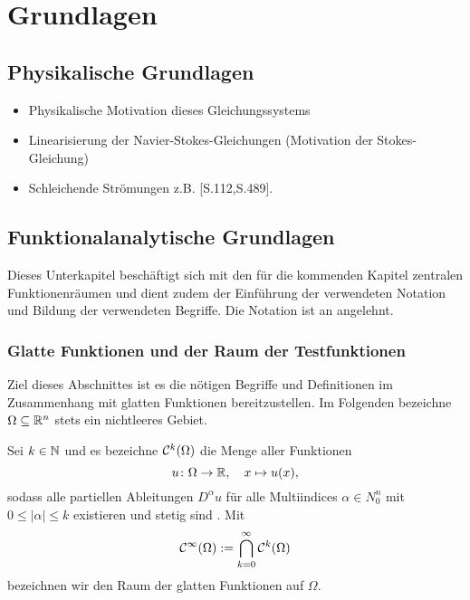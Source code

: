 \chapter{Grundlagen}
\label{cp:grundlagen}

\section{Physikalische Grundlagen}

\begin{itemize}
  \item Physikalische Motivation dieses Gleichungssystems
  \item Linearisierung der Navier-Stokes-Gleichungen (Motivation der Stokes-Gleichung)
  \item Schleichende Strömungen z.B. \cite{spurk10stroemungslehre}[S.112,S.489]. 
\end{itemize}

\section{Funktionalanalytische Grundlagen}

Dieses Unterkapitel beschäftigt sich mit den für die kommenden Kapitel zentralen Funktionenräumen und dient zudem der Einführung der verwendeten Notation und Bildung der verwendeten Begriffe.
Die Notation ist an \cite{sohr2001navier} angelehnt.

\subsection{Glatte Funktionen und der Raum der Testfunktionen}
\label{subsec:smooth}

Ziel dieses Abschnittes ist es die nötigen Begriffe und Definitionen im Zusammenhang mit glatten Funktionen bereitzustellen.
Im Folgenden bezeichne $\Omega \subseteq \mathbb{R}^n$ stets ein nichtleeres Gebiet.

Sei $k \in \mathbb{N}$ und es bezeichne $\mathcal{C}^k(\Omega)$ die Menge aller Funktionen
$$
u \colon \Omega \to \mathbb{R}, \quad x \mapsto u(x),
$$
sodass alle partiellen Ableitungen $D^\alpha u$ für alle Multiindices $\alpha \in N_0^n$ mit $0 \leq |\alpha| \leq k$ existieren und stetig sind . Mit
$$
  \mathcal{C}^\infty(\Omega) := \bigcap_{k = 0}^\infty \mathcal{C}^k(\Omega)
$$
bezeichnen wir den Raum der glatten Funktionen auf $\Omega$.

